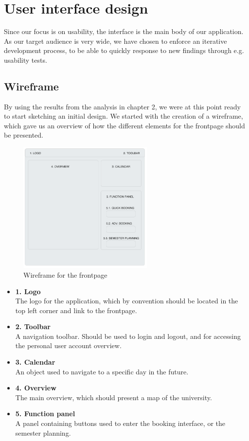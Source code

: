 \chapter{User interface design}
\label{chap:user_interface_design}
Since our focus is on usability, the interface is the main body of our application. As our target audience is very wide, we have chosen to enforce an iterative development process, to be able to quickly response to new findings through e.g. usability tests.

\section{Wireframe}
\label{sec:wireframe}
By using the results from the analysis in chapter 2, we were at this point ready to start sketching an initial design. We started with the creation of a wireframe, which gave us an overview of how the different elements for the frontpage should be presented.

\begin{figure}[htb]
\begin{center}
\leavevmode
\includegraphics[width=0.6\textwidth]{images/wireframe1}
\end{center}
\caption{Wireframe for the frontpage}
\label{fig:wireframe_frontpage}
\end{figure}

\begin{itemize}
	\item \textbf{1. Logo}\\
	The logo for the application, which by convention should be located in the top left corner and link to the frontpage. \cite{steve}
	\item \textbf{2. Toolbar}\\
	A navigation toolbar. Should be used to login and logout, and for accessing the personal user account overview.
	\item \textbf{3. Calendar}\\
	An object used to navigate to a specific day in the future.
	\item \textbf{4. Overview}\\
	The main overview, which should present a map of the university.
	\item \textbf{5. Function panel}\\
	A panel containing buttons used to enter the booking interface, or the semester planning.
\end{itemize}

